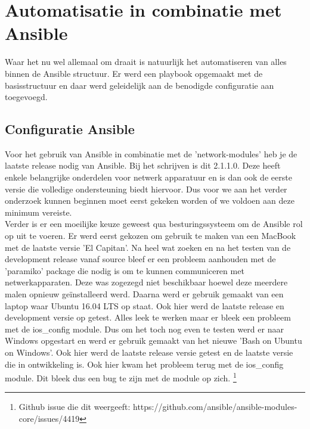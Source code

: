 
\chapter{Automatisatie in combinatie met Ansible}
\label{ch:ansible}
Waar het nu wel allemaal om draait is natuurlijk het automatiseren van alles binnen de Ansible structuur. Er werd een playbook opgemaakt met de basisstructuur en daar werd geleidelijk aan de benodigde configuratie aan toegevoegd.

\section{Configuratie Ansible}
\label{ch:ansibleconfiguratie}
Voor het gebruik van Ansible in combinatie met de 'network-modules' heb je de laatste release nodig van Ansible. Bij het schrijven is dit 2.1.1.0. Deze heeft enkele belangrijke onderdelen voor netwerk apparatuur en is dan ook de eerste versie die volledige ondersteuning biedt hiervoor. Dus voor we aan het verder onderzoek kunnen beginnen moet eerst gekeken worden of we voldoen aan deze minimum vereiste. \autocite{ansiblechangelog}
\\

Verder is er een moeilijke keuze geweest qua besturingssysteem om de Ansible rol op uit te voeren. Er werd eerst gekozen om gebruik te maken van een MacBook met de laatste versie 'El Capitan'. Na heel wat zoeken en na het testen van de development release vanaf source bleef er een probleem aanhouden met de 'paramiko' package die nodig is om te kunnen communiceren met netwerkapparaten. Deze was zogezegd niet beschikbaar hoewel deze meerdere malen opnieuw geïnstalleerd werd. Daarna werd er gebruik gemaakt van een laptop waar Ubuntu 16.04 LTS op staat. Ook hier werd de laatste release en development versie op getest. Alles leek te werken maar er bleek een probleem met de ios\_config module. Dus om het toch nog even te testen werd er naar Windows opgestart en werd er gebruik gemaakt van het nieuwe 'Bash on Ubuntu on Windows'. Ook hier werd de laatste release versie getest en de laatste versie die in ontwikkeling is. Ook hier kwam het probleem terug met de ios\_config module. Dit bleek dus een bug te zijn met de module op zich. \footnote{Github issue die dit weergeeft: https://github.com/ansible/ansible-modules-core/issues/4419}
\\

